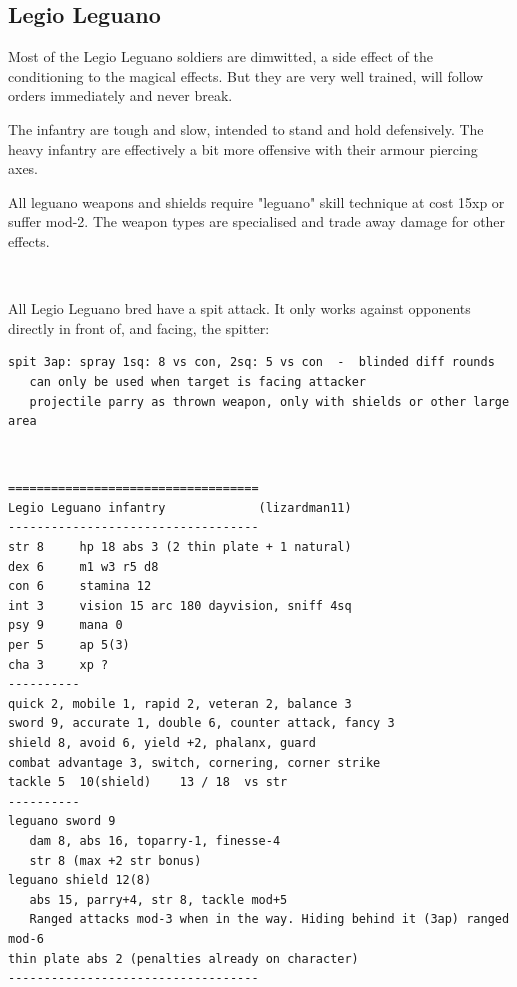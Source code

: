 \clearpage
{}
\subsection*{Legio Leguano}
Most of the Legio Leguano soldiers are dimwitted, a side effect of the conditioning to the magical effects. But they are very well trained, will follow orders immediately and never break.

The infantry are tough and slow, intended to stand and hold defensively. The heavy infantry are effectively a bit more offensive with their armour piercing axes.

All leguano weapons and shields require "leguano" skill technique at cost 15xp or suffer mod-2. The weapon types are specialised and trade away damage for other effects.

\

\noindent
All Legio Leguano bred have a spit attack. It only works against opponents directly in front of, and facing, the spitter:

\small \begin{verbatim}
spit 3ap: spray 1sq: 8 vs con, 2sq: 5 vs con  -  blinded diff rounds
   can only be used when target is facing attacker
   projectile parry as thrown weapon, only with shields or other large area
\end{verbatim} \normalsize


\

\goodbreak
\begin{samepage}
\small \begin{verbatim}
===================================
Legio Leguano infantry             (lizardman11)
-----------------------------------
str 8     hp 18 abs 3 (2 thin plate + 1 natural)
dex 6     m1 w3 r5 d8
con 6     stamina 12
int 3     vision 15 arc 180 dayvision, sniff 4sq
psy 9     mana 0
per 5     ap 5(3)
cha 3     xp ?
----------
quick 2, mobile 1, rapid 2, veteran 2, balance 3
sword 9, accurate 1, double 6, counter attack, fancy 3
shield 8, avoid 6, yield +2, phalanx, guard
combat advantage 3, switch, cornering, corner strike
tackle 5  10(shield)    13 / 18  vs str
----------
leguano sword 9
   dam 8, abs 16, toparry-1, finesse-4
   str 8 (max +2 str bonus)
leguano shield 12(8)
   abs 15, parry+4, str 8, tackle mod+5
   Ranged attacks mod-3 when in the way. Hiding behind it (3ap) ranged mod-6
thin plate abs 2 (penalties already on character)
-----------------------------------
\end{verbatim} \normalsize
\end{samepage}

